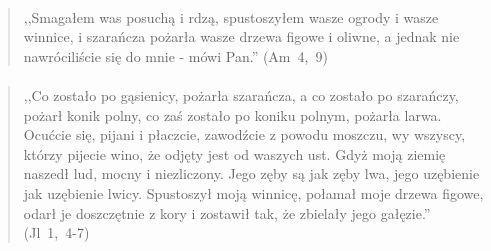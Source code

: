 \documentclass[10pt,a4paper,oneside]{article}
\begin{document}
\paragraph{}
\begin{quote}
,,Smagałem was posuchą i rdzą, spustoszyłem wasze ogrody i wasze winnice, i szarańcza pożarła wasze drzewa figowe i oliwne, a jednak nie nawróciliście się do mnie - mówi Pan.'' \mbox{(Am 4, 9)}
\end{quote}
\paragraph{}
\begin{quote}
,,Co zostało po gąsienicy, pożarła szarańcza, a co zostało po szarańczy, pożarł konik polny, co zaś zostało po koniku polnym, pożarła larwa. Ocućcie się, pijani i płaczcie, zawodźcie z powodu moszczu, wy wszyscy, którzy pijecie wino, że odjęty jest od waszych ust. Gdyż moją ziemię naszedł lud, mocny i niezliczony. Jego zęby są jak zęby lwa, jego uzębienie jak uzębienie lwicy. Spustoszył moją winnicę, połamał moje drzewa figowe, odarł je doszczętnie z kory i zostawił tak, że zbielały jego gałęzie.'' \mbox{(Jl 1, 4-7)}
\end{quote}
\end{document}
